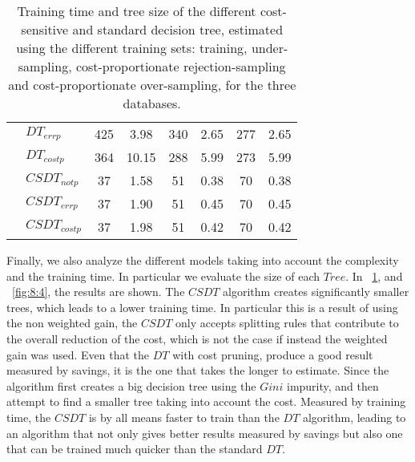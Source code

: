 \begin{table}
\begin{tabular}{|c|l|c c|c c|c c|}
    &$DT_{err p}$&425&3.98&340&2.65&277&2.65\\
    &$DT_{cost p}$&364&10.15&288&5.99&273&5.99\\
    &$CSDT_{not p}$&37&1.58&51&0.38&70&0.38\\
    &$CSDT_{err p}$&37&1.90&51&0.45&70&0.45\\
    &$CSDT_{cost p}$&37&1.98&51&0.42&70&0.42\\
    \hline
  \end{tabular} 
  \caption{Training time and tree size of the different cost-sensitive and standard decision 
  tree, estimated using the different training sets: training, under-sampling, 
  cost-proportionate rejection-sampling and cost-proportionate over-sampling, for the three 
  databases.}
  \label{tab:8:2}
\end{table}

  
Finally, we also analyze the different models taking into account the complexity and the 
training time. In particular we evaluate the size of each $Tree$. In \tablename{~\ref{tab:8:2}}, 
and \figurename{~\ref{fig:8:4}}, the results are shown. The $CSDT$ algorithm creates significantly 
smaller trees, which leads to a lower training time. In particular this is a result of using the 
non weighted gain, the $CSDT$ only accepts splitting rules that contribute to the overall reduction 
of the cost, which is not the case if instead the weighted gain was used. Even that the $DT$ 
with cost pruning, produce a good result measured by savings, it is the one that takes the 
longer to estimate. Since the algorithm first creates a big decision tree using the $Gini$ 
impurity, and then attempt to find a smaller tree taking into account the cost. Measured by 
training time, the $CSDT$ is by all means faster to train than the $DT$ algorithm, leading to 
an algorithm that not only gives better results measured by savings but also one that can be 
trained much quicker than the standard $DT$.
